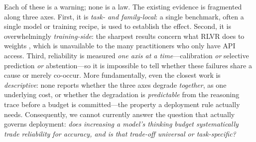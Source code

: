 \documentclass[11pt]{article}
\begin{document}
Each of these is a warning; none is a law.
The existing evidence is fragmented along three axes.
First, it is \emph{task- and family-local}: a single benchmark, often a
single model or training recipe, is used to establish the effect.
Second, it is overwhelmingly \emph{training-side}: the sharpest results
concern what RLVR does to weights \citep{Wang2026CAPO, Jin2025Entropy},
which is unavailable to the many practitioners who only have API access.
Third, reliability is measured \emph{one axis at a time}---calibration
\emph{or} selective prediction \emph{or} abstention---so it is impossible to
tell whether these failures share a cause or merely co-occur.
More fundamentally, even the closest work is \emph{descriptive}: none reports
whether the three axes degrade \emph{together}, as one underlying cost, or
whether the degradation is \emph{predictable} from the reasoning trace before
a budget is committed---the property a deployment rule actually needs.
Consequently, we cannot currently answer the question that actually governs
deployment: \emph{does increasing a model's thinking budget systematically
trade reliability for accuracy, and is that trade-off universal or
task-specific?}
\end{document}
